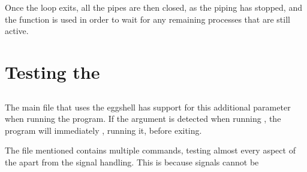 \documentclass[12pt, a4paper]{report}
\begin{document}
                Once the loop exits, all the pipes are then closed, as the piping has stopped, and
                the  function is used in order to wait for any remaining processes that are
                still active.

    \chapter{Testing the }
        \section{}
            The main file that uses the eggshell has support for this additional
            parameter when running the program. If the  argument is 
            detected when running , the program will immediately
            , running it, before exiting. 

            The file mentioned contains multiple commands, testing almost every
            aspect of the  apart from the signal handling. This is 
            because signals cannot be 
\end{document}
